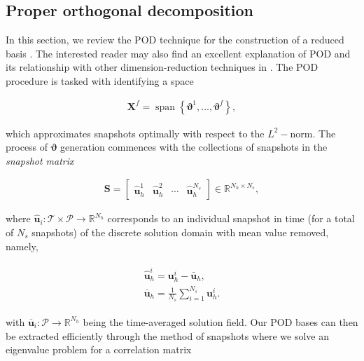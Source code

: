 \documentclass[preprint,12pt]{elsarticle}
\begin{document}
\subsection{Proper orthogonal decomposition}

In this section, we review the POD technique for the construction of a reduced basis \cite{kosambi1943statistics,berkooz1993proper}. The interested reader may also find an excellent explanation of POD and its relationship with other dimension-reduction techniques in \cite{taira2019modal}. The POD procedure is tasked with identifying a space
\begin{linenomath*}
\begin{align}
\mathbf{X}^{f}=\operatorname{span}\left\{\boldsymbol{\vartheta}^{1}, \dots, \boldsymbol{\vartheta}^{f}\right\},
\end{align}
\end{linenomath*}
which approximates snapshots optimally with respect to the $L^2-$norm. The process of $\boldsymbol{\vartheta}$ generation commences with the collections of snapshots in the \emph{snapshot matrix}
\begin{linenomath*}
\begin{align}
\mathbf{S} = [\begin{array}{c|c|c|c}{\hat{\mathbf{u}}^{1}_h} & {\hat{\mathbf{u}}^{2}_h} & {\cdots} & {\hat{\mathbf{u}}^{N_{s}}_h}\end{array}] \in \mathbb{R}^{N_{h} \times N_{s}},
\end{align}
\end{linenomath*}
where $\hat{\mathbf{u}}_i : \mathcal{T} \times \mathcal{P} \rightarrow \mathbb{R}^{N_h}$ corresponds to an individual snapshot in time (for a total of $N_s$ snapshots) of the discrete solution domain with mean value removed, namely,
\begin{linenomath*}
\begin{align}
\begin{gathered}
\hat{\mathbf{u}}^i_h = \mathbf{u}^i_h - \mathbf{\bar{u}}_h, \\
\mathbf{\bar{u}}_h = \frac{1}{N_s} \sum_{i=1}^{N_s} \mathbf{u}^i_h.
\end{gathered}
\end{align}
\end{linenomath*}
with $\overline{\mathbf{u}}_i : \mathcal{P} \rightarrow \mathbb{R}^{N_h}$ being the time-averaged solution field. Our POD bases can then be extracted efficiently through the method of snapshots where we solve an eigenvalue problem for a correlation matrix
\end{document}
